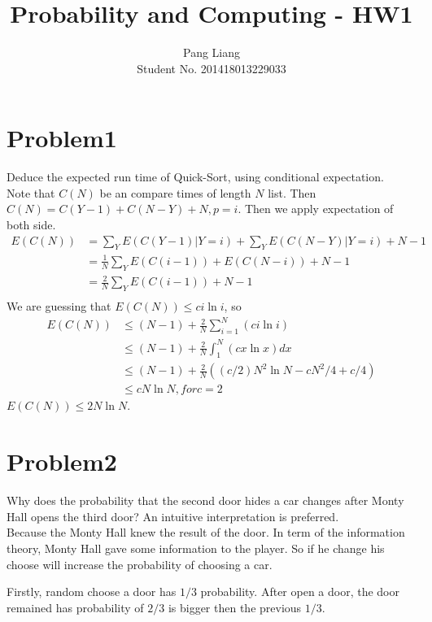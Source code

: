 \documentclass[12pt]{article}
\title{Probability and Computing - HW1}
\author{Pang Liang\\ Student No. 201418013229033}
\begin{document}
\maketitle

\section{Problem1}
Deduce the expected run time of Quick-Sort, using conditional expectation.\\

Note that $C(N)$ be an compare times of length $N$ list. Then $C(N) = C(Y-1)+C(N-Y)+N, p=i$. Then we apply expectation of both side.
\begin{equation}
    \begin{split}
    E(C(N)) &= \sum_Y E(C(Y-1) | Y=i) + \sum_Y E(C(N-Y) | Y=i) + N-1 \\
            &= \frac{1}{N} \sum_Y E(C(i-1)) + E(C(N-i)) + N-1 \\
            &= \frac{2}{N} \sum_Y E(C(i-1)) + N-1 \\
    \end{split}
\end{equation}
We are guessing that $E(C(N))\le ci \ln i$, so
\begin{equation}
    \begin{split}
    E(C(N)) &\le (N-1)+\frac{2}{N} \sum_{i=1}^{N}(c i \ln i) \\
            &\le (N-1)+\frac{2}{N} \int_{1}^{N} (c x \ln x) dx \\
            &\le (N-1)+\frac{2}{N}((c/2)N^2\ln N - cN^2/4+c/4)\\
            &\le cN \ln N, for c=2
    \end{split}
\end{equation}
$E(C(N)) \le 2N\ln N$.

\section{Problem2}
Why does the probability that the second door hides a car changes after Monty Hall opens the third door? An intuitive interpretation is preferred.\\

Because the Monty Hall knew the result of the door. In term of the information theory, Monty Hall gave some information to the player. So if he change his choose will increase the probability of choosing a car.

Firstly, random choose a door has $1/3$ probability. After open a door, the door remained has probability of $2/3$ is bigger then the previous $1/3$.
\end{document}
